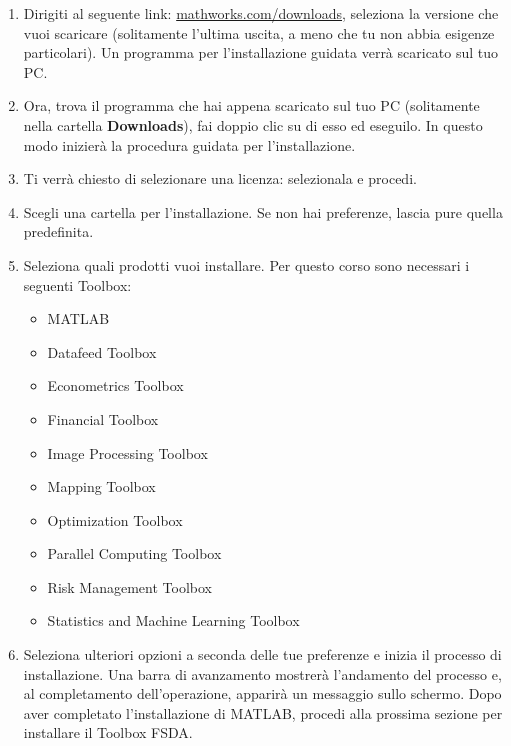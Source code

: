 \documentclass[a4paper, 12pt]{article}
\begin{document}
\begin{enumerate}
	\item Dirigiti al seguente link:
	      \href{https://www.mathworks.com/downloads/}{mathworks.com/downloads},
	      seleziona la versione che vuoi scaricare (solitamente l'ultima uscita,
	      a meno che tu non abbia esigenze particolari). Un programma per
	      l'installazione guidata verrà scaricato sul tuo PC.
	      	      
	\item Ora, trova il programma che hai appena scaricato sul tuo PC
	    (solitamente nella cartella \textbf{Downloads}), fai doppio clic su di
	    esso ed eseguilo. In questo modo inizierà la procedura guidata per
	    l'installazione.
	      	      
	\item Ti verrà chiesto di selezionare una licenza: selezionala e procedi.
	      	      
	\item Scegli una cartella per l'installazione. Se non hai preferenze, lascia
	pure quella predefinita.
	      	      
	\item Seleziona quali prodotti vuoi installare. Per questo corso sono
	necessari i seguenti Toolbox:
	      \begin{itemize}
	      	\item MATLAB
	      	\item Datafeed Toolbox
	      	\item Econometrics Toolbox
	      	\item Financial Toolbox
	      	\item Image Processing Toolbox
	      	\item Mapping Toolbox
		    \item Optimization Toolbox		
	      	\item Parallel Computing Toolbox
	      	\item Risk Management Toolbox
	      	\item Statistics and Machine Learning Toolbox
	      \end{itemize}
	    
	\item Seleziona ulteriori opzioni a seconda delle tue preferenze e inizia il
	processo di installazione. Una barra di avanzamento mostrerà l'andamento del
	processo e, al completamento dell'operazione, apparirà un messaggio sullo
	schermo. Dopo aver completato l'installazione di MATLAB, procedi alla
	prossima sezione per installare il Toolbox FSDA.
\end{enumerate}
\end{document}
